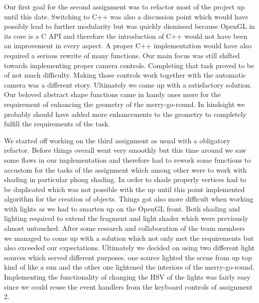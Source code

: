 \documentclass{report}
\begin{document}
Our first goal for the second assignment was to refactor most of the project up until this date. Switching to C++ was also a discussion point which would have possibly lead to further modularity but was quickly dismissed because OpenGL in its core is a C API and therefore the introduction of C++ would not have been an improvement in every aspect. A proper C++ implementation would have also required a serious rewrite of many functions. Our main focus was still shifted towards implementing proper camera controls. Completing that task proved to be of not much difficulty. Making those controls work together with the automatic camera was a different story. Ultimately we came up with a satisfactory solution. Our beloved abstract shape functions came in handy ones more for the requirement of enhancing the geometry of the merry-go-round. In hindsight we probably should have added more enhancements to the geometry to completely fulfill the requirements of the task.
\par
We started off working on the third assignment as usual with a obligatory refactor. Before things overall went very smoothly but this time around we saw some flaws in our implementation and therefore had to rework some functions to accustom for the tasks of the assignment which among other were to work with shading in particular phong shading. In order to shade properly vertices had to be duplicated which was not possible with the up until this point implemented algorithm for the creation of objects. Things got also more difficult when working with lights as we had to smarten up on the OpenGL front. Both shading and lighting required to extend the fragment and light shader which were previously almost untouched. After some research and collaboration of the team members we managed to come up with a solution which not only met the requirements but also exceeded our expectations. Ultimately we decided on using two different light sources which served different purposes. one source lighted the scene from up top kind of like a sun and the other one lightened the interiors of the merry-go-round. Implementing the functionality of changing the HSV of the lights was fairly easy since we could reuse the event handlers from the keyboard controls of assignment 2.
\end{document}

